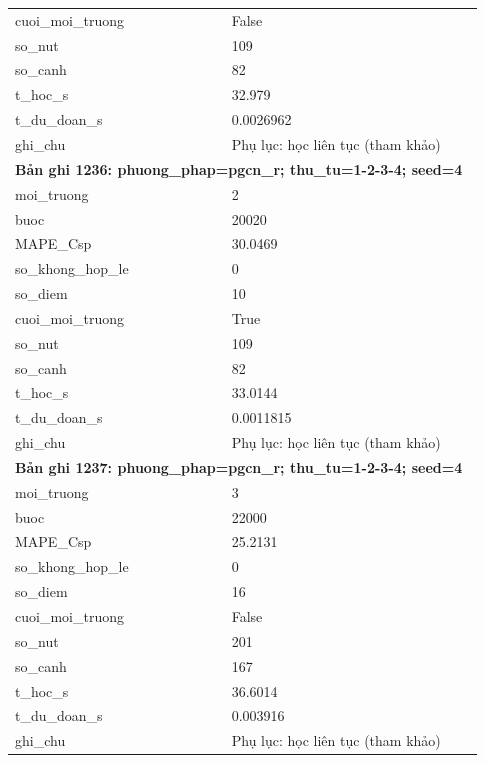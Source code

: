 \begin{longtable}{p{0.43\linewidth}p{0.50\linewidth}}
cuoi\_\allowbreak moi\_\allowbreak truong & False \\
so\_\allowbreak nut & 109 \\
so\_\allowbreak canh & 82 \\
t\_\allowbreak hoc\_\allowbreak s & 32.979 \\
t\_\allowbreak du\_\allowbreak doan\_\allowbreak s & 0.0026962 \\
ghi\_\allowbreak chu & Phụ lục: học liên tục (tham khảo) \\
\midrule
\multicolumn{2}{p{0.95\linewidth}}{\textbf{Bản ghi 1236: phuong\_phap=pgcn\_r; thu\_tu=1-2-3-4; seed=4}} \\
moi\_\allowbreak truong & 2 \\
buoc & 20020 \\
MAPE\_\allowbreak Csp & 30.0469 \\
so\_\allowbreak khong\_\allowbreak hop\_\allowbreak le & 0 \\
so\_\allowbreak diem & 10 \\
cuoi\_\allowbreak moi\_\allowbreak truong & True \\
so\_\allowbreak nut & 109 \\
so\_\allowbreak canh & 82 \\
t\_\allowbreak hoc\_\allowbreak s & 33.0144 \\
t\_\allowbreak du\_\allowbreak doan\_\allowbreak s & 0.0011815 \\
ghi\_\allowbreak chu & Phụ lục: học liên tục (tham khảo) \\
\midrule
\multicolumn{2}{p{0.95\linewidth}}{\textbf{Bản ghi 1237: phuong\_phap=pgcn\_r; thu\_tu=1-2-3-4; seed=4}} \\
moi\_\allowbreak truong & 3 \\
buoc & 22000 \\
MAPE\_\allowbreak Csp & 25.2131 \\
so\_\allowbreak khong\_\allowbreak hop\_\allowbreak le & 0 \\
so\_\allowbreak diem & 16 \\
cuoi\_\allowbreak moi\_\allowbreak truong & False \\
so\_\allowbreak nut & 201 \\
so\_\allowbreak canh & 167 \\
t\_\allowbreak hoc\_\allowbreak s & 36.6014 \\
t\_\allowbreak du\_\allowbreak doan\_\allowbreak s & 0.003916 \\
ghi\_\allowbreak chu & Phụ lục: học liên tục (tham khảo) \\

\end{longtable}
